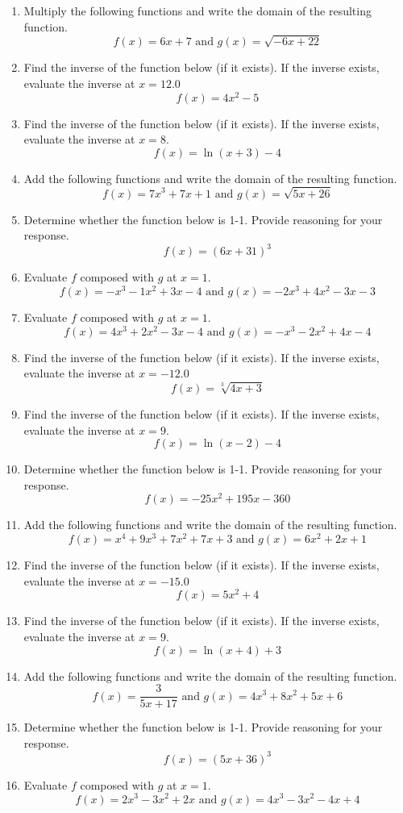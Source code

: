 \documentclass[14pt]{extbook}
\begin{document}
\begin{enumerate}
\item{
Multiply the following functions and write the domain of the resulting function.\[ f(x) = 6x + 7 \text{ and } g(x) = \sqrt{-6x+22}  \]} \newpage
\item{
Find the inverse of the function below (if it exists). If the inverse exists, evaluate the inverse at $x = 12.0$\[ f(x) = 4 x^2 - 5 \]} \newpage
\item{
Find the inverse of the function below (if it exists). If the inverse exists, evaluate the inverse at $x = 8$.\[ f(x) = \ln{(x+3)}-4 \]} \newpage
\item{
Add the following functions and write the domain of the resulting function.\[ f(x) = 7x^{3} +7 x + 1 \text{ and } g(x) = \sqrt{5x+26}  \]} \newpage
\item{
Determine whether the function below is 1-1. Provide reasoning for your response.\[ f(x) = (6 x + 31)^3 \]} \newpage
\item{
Evaluate $f$ composed with $g$ at $x=1$.\[ f(x) = -x^{3} -1 x^{2} +3 x -4 \text{ and } g(x) = -2x^{3} +4 x^{2} -3 x -3 \]} \newpage
\item{
Evaluate $f$ composed with $g$ at $x=1$.\[ f(x) = 4x^{3} +2 x^{2} -3 x -4 \text{ and } g(x) = -x^{3} -2 x^{2} +4 x -4 \]} \newpage
\item{
Find the inverse of the function below (if it exists). If the inverse exists, evaluate the inverse at $x = -12.0$\[ f(x) = \sqrt[3]{4 x + 3} \]} \newpage
\item{
Find the inverse of the function below (if it exists). If the inverse exists, evaluate the inverse at $x = 9$.\[ f(x) = \ln{(x-2)}-4 \]} \newpage
\item{
Determine whether the function below is 1-1. Provide reasoning for your response.\[ f(x) = -25 x^2 + 195 x - 360 \]} \newpage
\item{
Add the following functions and write the domain of the resulting function.\[ f(x) = x^{4} +9 x^{3} +7 x^{2} +7 x + 3 \text{ and } g(x) = 6x^{2} +2 x + 1 \]} \newpage
\item{
Find the inverse of the function below (if it exists). If the inverse exists, evaluate the inverse at $x = -15.0$\[ f(x) = 5 x^2 + 4 \]} \newpage
\item{
Find the inverse of the function below (if it exists). If the inverse exists, evaluate the inverse at $x = 9$.\[ f(x) = \ln{(x+4)}+3 \]} \newpage
\item{
Add the following functions and write the domain of the resulting function.\[ f(x) = \frac{3}{5x+17} \text{ and } g(x) = 4x^{3} +8 x^{2} +5 x + 6 \]} \newpage
\item{
Determine whether the function below is 1-1. Provide reasoning for your response.\[ f(x) = (5 x + 36)^3 \]} \newpage
\item{
Evaluate $f$ composed with $g$ at $x=1$.\[ f(x) = 2x^{3} -3 x^{2} +2 x \text{ and } g(x) = 4x^{3} -3 x^{2} -4 x + 4 \]} \newpage
\end{enumerate}
\end{document}
